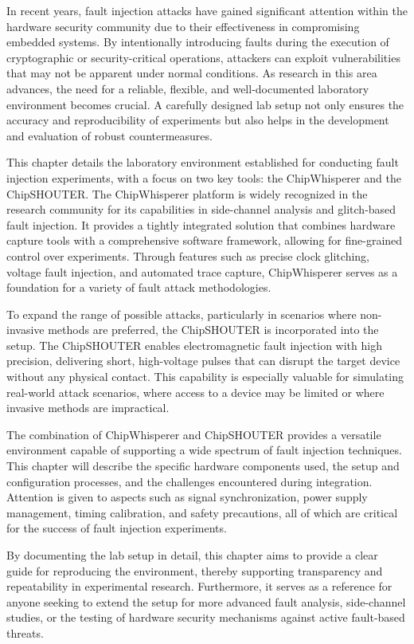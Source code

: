 In recent years, fault injection attacks have gained significant attention within the hardware security community due to their effectiveness in compromising embedded systems. By intentionally introducing faults during the execution of cryptographic or security-critical operations, attackers can exploit vulnerabilities that may not be apparent under normal conditions. As research in this area advances, the need for a reliable, flexible, and well-documented laboratory environment becomes crucial. A carefully designed lab setup not only ensures the accuracy and reproducibility of experiments but also helps in the development and evaluation of robust countermeasures.

This chapter details the laboratory environment established for conducting fault injection experiments, with a focus on two key tools: the ChipWhisperer and the ChipSHOUTER. The ChipWhisperer platform is widely recognized in the research community for its capabilities in side-channel analysis and glitch-based fault injection. It provides a tightly integrated solution that combines hardware capture tools with a comprehensive software framework, allowing for fine-grained control over experiments. Through features such as precise clock glitching, voltage fault injection, and automated trace capture, ChipWhisperer serves as a foundation for a variety of fault attack methodologies.

To expand the range of possible attacks, particularly in scenarios where non-invasive methods are preferred, the ChipSHOUTER is incorporated into the setup. The ChipSHOUTER enables electromagnetic fault injection with high precision, delivering short, high-voltage pulses that can disrupt the target device without any physical contact. This capability is especially valuable for simulating real-world attack scenarios, where access to a device may be limited or where invasive methods are impractical.

The combination of ChipWhisperer and ChipSHOUTER provides a versatile environment capable of supporting a wide spectrum of fault injection techniques. This chapter will describe the specific hardware components used, the setup and configuration processes, and the challenges encountered during integration. Attention is given to aspects such as signal synchronization, power supply management, timing calibration, and safety precautions, all of which are critical for the success of fault injection experiments.

By documenting the lab setup in detail, this chapter aims to provide a clear guide for reproducing the environment, thereby supporting transparency and repeatability in experimental research. Furthermore, it serves as a reference for anyone seeking to extend the setup for more advanced fault analysis, side-channel studies, or the testing of hardware security mechanisms against active fault-based threats.

